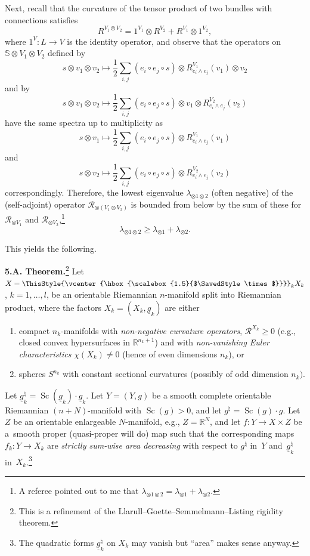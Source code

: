 \documentclass[pdftex]{sigma}
\numberwithin{equation}{section}
\newcommand\bigtimes{\mathbin{\ThisStyle{\vcenter{\hbox{%
\scalebox{1.5}{$\SavedStyle\times$}}}}}}
\begin{document}
Next, recall that the curvature of the tensor product of two bundles with connections satisfies
\[
R^{V_1\otimes V_2}=1^{V_1}\otimes R^{ V_2}+R^{V_1}\otimes 1^{V_2},
\]
where $1^V\colon L\to V$ is the identity operator, and observe that
 the operators on $\mathbb S\otimes V_1\otimes V_2$ defined by
\[
s\otimes v_1\otimes v_2\mapsto \frac {1}{2}\sum_{i,j}(e_i\circ e_j\circ s)
 \otimes R^{V_1}_{e_i\wedge e_j}(v_1)\otimes v_2
 \]
and by
\[
s\otimes v_1\otimes v_2\mapsto \frac {1}{2}\sum_{i,j}(e_i\circ e_j\circ s)
 \otimes v_1\otimes R^{V_2}_{e_i\wedge e_j}(v_2)
 \]
have the same spectra up to multiplicity as
\[
s\otimes v_1\mapsto \frac {1}{2}\sum_{i,j}(e_i\circ e_j\circ s) \otimes R^{V_1}_{e_i\wedge e_j}(v_1)
\]
and
\[
s\otimes v_2\mapsto \frac {1}{2}\sum_{i,j}(e_i\circ e_j\circ s)
 \otimes R^{V_2}_{e_i\wedge e_j}(v_2)
\]
correspondingly.
Therefore, the lowest eigenvalue $\lambda_{\otimes1\otimes 2} $ (often negative) of the (self-adjoint) operator $\mathcal R_{\otimes (V_1\otimes V_2)}$ is bounded from below by the sum of these for
$\mathcal R_{\otimes V_1}$ and $\mathcal R_{\otimes V_2}$,\footnote{A referee pointed out to me that $\lambda_{\otimes 1\otimes 2}= \lambda_{\otimes 1}+\lambda_{\otimes 2}$.}
\[
\lambda_{\otimes 1\otimes 2}\geq \lambda_{\otimes 1}+\lambda_{\otimes 2}.
\]

This yields the following.

\textbf {5.A. Theorem.}\footnote{This is a refinement of the Llarull--Goette--Semmelmann--Listing rigidity theorem.}
Let $X=\bigtimes_k X_k$, $k=1,\dots,l$, be an orientable Riemannian $n$-manifold split into Riemannian product, where the factors $X_k =(X_k,\underline g_k)$ are
either
\begin{enumerate}\itemsep=0pt
\item[(a)] compact $n_k$-manifolds with {\it non-negative curvature operators}, $\mathcal R^{X_k}\geq 0$ (e.g., closed convex hypersurfaces in $\mathbb R^{n_k+1}$)
 and with {\it non-vanishing Euler characteristics} $\chi(X_k)\neq 0$ (hence of even dimensions $n_k$),
 or
\item[(b)] spheres $S^{n_k}$ with constant sectional curvatures $($possibly of odd dimension $n_k)$.
\end{enumerate}

 Let $\underline g^\natural_k =\operatorname{Sc}(\underline g_k)\cdot \underline g_k$.
 Let $Y=(Y,g) $ be a smooth complete orientable Riemannian $(n+N)$-manifold with $\operatorname{Sc}(g) >0$,
and let $g^\natural =\operatorname{Sc}(g) \cdot g$.
Let
 $Z$ be an orientable enlargeable $N$-manifold, e.g., $Z=\mathbb R^N$,
and let
$f\colon Y\to X\times Z$ be a~smooth proper (quasi-proper will do) map such that
the corresponding maps $f_k\colon Y\to X_k$ are {\it strictly sum-wise area decreasing} with respect to $g^\natural$
in~$Y$ and~$\underline g^\natural_k $ in~$X_k$.\footnote{The quadratic forms $\underline g^\natural_k$ on $ X_k$ may vanish but ``area'' makes sense anyway.}
\end{document}
